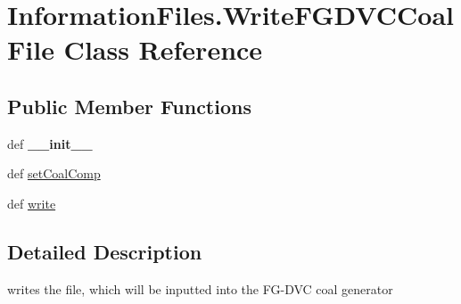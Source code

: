 \hypertarget{classInformationFiles_1_1WriteFGDVCCoalFile}{\section{\-Information\-Files.\-Write\-F\-G\-D\-V\-C\-Coal\-File \-Class \-Reference}
\label{classInformationFiles_1_1WriteFGDVCCoalFile}
}
\subsection*{\-Public \-Member \-Functions}
\begin{DoxyCompactItemize}
\item 
\hypertarget{classInformationFiles_1_1WriteFGDVCCoalFile_a883aa6ba345937ce6f02e697ed4795bc}{def {\bfseries \-\_\-\-\_\-init\-\_\-\-\_\-}}\label{classInformationFiles_1_1WriteFGDVCCoalFile_a883aa6ba345937ce6f02e697ed4795bc}

\item 
def \hyperlink{classInformationFiles_1_1WriteFGDVCCoalFile_a68047cbb6204ab768531f81cc116200e}{set\-Coal\-Comp}
\item 
def \hyperlink{classInformationFiles_1_1WriteFGDVCCoalFile_a3c3a2e6a160e9e34c46f9572f8b9f91c}{write}
\end{DoxyCompactItemize}


\subsection{\-Detailed \-Description}
\begin{DoxyVerb}writes the file, which will be inputted into the FG-DVC coal generator\end{DoxyVerb}
 

